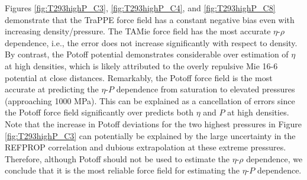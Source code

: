 \documentclass[preprint,review,12pt]{elsarticle}
\begin{document}
	Figures \ref{fig:T293highP_C3}, \ref{fig:T293highP_C4}, and \ref{fig:T293highP_C8} demonstrate that the TraPPE force field has a constant negative bias even with increasing density/pressure. The TAMie force field has the most accurate $\eta$-$\rho$ dependence, i.e., the error does not increase significantly with respect to density. By contrast, the Potoff potential demonstrates considerable over estimation of $\eta$ at high densities, which is likely attributed to the overly repulsive Mie 16-6 potential at close distances. Remarkably, the Potoff force field is the most accurate at predicting the $\eta$-$P$ dependence from saturation to elevated pressures (approaching 1000 MPa). This can be explained as a cancellation of errors since the Potoff force field significantly over predicts both $\eta$ and $P$ at high densities. Note that the increase in Potoff deviations for the two highest pressures in Figure \ref{fig:T293highP_C3} can potentially be explained by the large uncertainty in the REFPROP correlation and dubious extrapolation at these extreme pressures. Therefore, although Potoff should not be used to estimate the $\eta$-$\rho$ dependence, we conclude that it is the most reliable force field for estimating the $\eta$-$P$ dependence.
\end{document}
